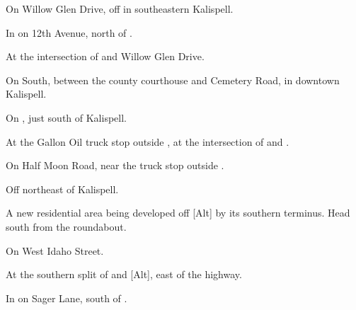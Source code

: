 

\begin{LocationList}

On Willow Glen Drive, off  in southeastern Kalispell.

In  on 12th Avenue, north of .

At the intersection of  and Willow Glen Drive.

On  South, between the county courthouse and Cemetery Road, in downtown Kalispell.

On , just south of Kalispell.

At the Gallon Oil truck stop outside , at the intersection of  and .

\Location{\GarageHQ \Garage}
On Half Moon Road, near the truck stop outside .

Off 
northeast of Kalispell.

A new residential area being developed off [Alt] by its southern terminus. Head south from the roundabout.

\Location{\RecruitmentAgency \Recruitment}
On  West Idaho Street.

At the southern split of  and [Alt], east of the highway.

In  on Sager Lane, south of .

\end{LocationList}

